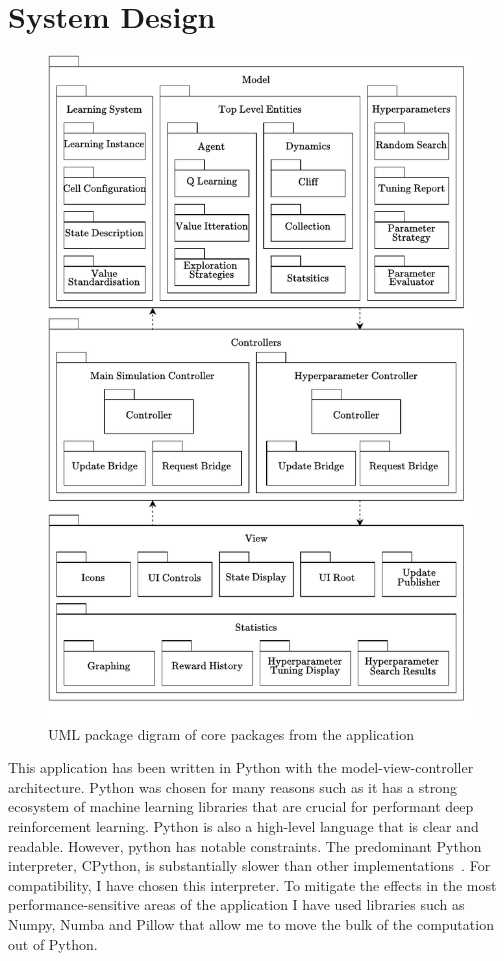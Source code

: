 \documentclass[]{final_report}
\begin{document}
\section{System Design}

\begin{figure}
  \centering
  
  \includegraphics[width=\textwidth]{package_diagram-2.pdf}
  
  \caption{\label{fig:package-diagram} UML package digram of core packages from the application}
\end{figure}

This application has been written in Python with the model-view-controller architecture. Python was chosen for many reasons such as it has a strong ecosystem of machine learning libraries that are crucial for performant deep reinforcement learning. Python is also a high-level language that is clear and readable. However, python has notable constraints.  The predominant Python interpreter, CPython, is substantially slower than other implementations~\cite{pythonMachineLearning}. For compatibility, I have chosen this interpreter. To mitigate the effects in the most performance-sensitive areas of the application I have used libraries such as Numpy, Numba and Pillow that allow me to move the bulk of the computation out of Python.  
\end{document}
